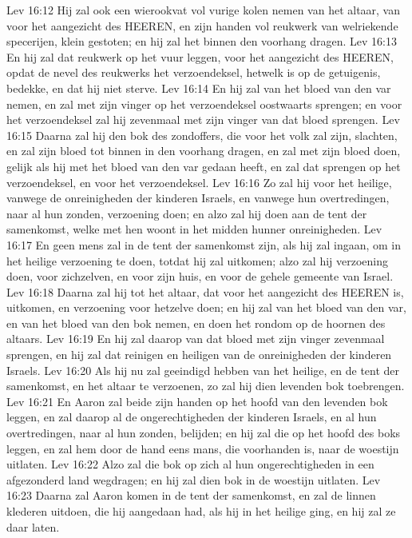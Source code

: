 Lev 16:12  Hij zal ook een wierookvat vol vurige kolen nemen van het altaar, van voor het aangezicht des HEEREN, en zijn handen vol reukwerk van welriekende specerijen, klein gestoten; en hij zal het binnen den voorhang dragen.
Lev 16:13  En hij zal dat reukwerk op het vuur leggen, voor het aangezicht des HEEREN, opdat de nevel des reukwerks het verzoendeksel, hetwelk is op de getuigenis, bedekke, en dat hij niet sterve.
Lev 16:14  En hij zal van het bloed van den var nemen, en zal met zijn vinger op het verzoendeksel oostwaarts sprengen; en voor het verzoendeksel zal hij zevenmaal met zijn vinger van dat bloed sprengen.
Lev 16:15  Daarna zal hij den bok des zondoffers, die voor het volk zal zijn, slachten, en zal zijn bloed tot binnen in den voorhang dragen, en zal met zijn bloed doen, gelijk als hij met het bloed van den var gedaan heeft, en zal dat sprengen op het verzoendeksel, en voor het verzoendeksel.
Lev 16:16  Zo zal hij voor het heilige, vanwege de onreinigheden der kinderen Israels, en vanwege hun overtredingen, naar al hun zonden, verzoening doen; en alzo zal hij doen aan de tent der samenkomst, welke met hen woont in het midden hunner onreinigheden.
Lev 16:17  En geen mens zal in de tent der samenkomst zijn, als hij zal ingaan, om in het heilige verzoening te doen, totdat hij zal uitkomen; alzo zal hij verzoening doen, voor zichzelven, en voor zijn huis, en voor de gehele gemeente van Israel.
Lev 16:18  Daarna zal hij tot het altaar, dat voor het aangezicht des HEEREN is, uitkomen, en verzoening voor hetzelve doen; en hij zal van het bloed van den var, en van het bloed van den bok nemen, en doen het rondom op de hoornen des altaars.
Lev 16:19  En hij zal daarop van dat bloed met zijn vinger zevenmaal sprengen, en hij zal dat reinigen en heiligen van de onreinigheden der kinderen Israels.
Lev 16:20  Als hij nu zal geeindigd hebben van het heilige, en de tent der samenkomst, en het altaar te verzoenen, zo zal hij dien levenden bok toebrengen.
Lev 16:21  En Aaron zal beide zijn handen op het hoofd van den levenden bok leggen, en zal daarop al de ongerechtigheden der kinderen Israels, en al hun overtredingen, naar al hun zonden, belijden; en hij zal die op het hoofd des boks leggen, en zal hem door de hand eens mans, die voorhanden is, naar de woestijn uitlaten.
Lev 16:22  Alzo zal die bok op zich al hun ongerechtigheden in een afgezonderd land wegdragen; en hij zal dien bok in de woestijn uitlaten.
Lev 16:23  Daarna zal Aaron komen in de tent der samenkomst, en zal de linnen klederen uitdoen, die hij aangedaan had, als hij in het heilige ging, en hij zal ze daar laten.
